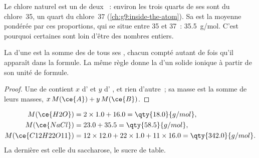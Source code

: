 \begin{remark}\label{rem:g10:the-mole:chlorine}
Le chlore naturel est un  de deux ~: environ les trois
quarts de ses  sont du chlore~35, un quart du chlore~37
(\cref{ch:g9:inside-the-atom}). Sa  est la
moyenne pondérée par ces proportions, qui se situe entre 35 et 37~:
\qty{35.5}{g/mol}. C'est pourquoi certaines 
sont loin d'être des nombres entiers.
\end{remark}

\begin{proposition}\label{prop:g10:the-mole:sum}
La  d'une  est la somme des  de tous ses , chacun compté autant de fois qu'il apparaît
dans la formule. La même règle donne la  d'un solide ionique
à partir de son unité de formule.
\end{proposition}

\begin{proof}
Une  de   contient $x$  d'  et
$y$  d' , et rien d'autre~; sa masse est la somme de
leurs masses, $x\,M(\ce{A}) + y\,M(\ce{B})$.
\end{proof}

\begin{example}\label{ex:g10:the-mole:three}
\begin{align*}
  M(\ce{H2O}) &= 2 \times 1.0 + 16.0 = \qty{18.0}{g/mol},\\
  M(\ce{NaCl}) &= 23.0 + 35.5 = \qty{58.5}{g/mol},\\
  M(\ce{C12H22O11}) &= 12 \times 12.0 + 22 \times 1.0 + 11 \times 16.0
     = \qty{342.0}{g/mol}.
\end{align*}
La dernière est celle du saccharose, le sucre de table.
\end{example}

